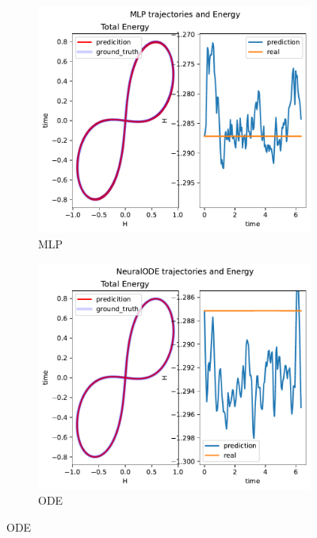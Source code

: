 \begin{figure}[H]
	\centering
	\begin{subfigure}[b]{0.3\textwidth}
		\centering
		\includegraphics[width=\textwidth]{chapters/chapter5/body3_mlp_traj.pdf}
		\caption{MLP}
	\end{subfigure}
	\hfill
	\begin{subfigure}[b]{0.3\textwidth}
		\centering
		\includegraphics[width=\textwidth]{chapters/chapter5/body3_ode_traj.pdf}
		\caption{ODE}
	\end{subfigure}
	\hfill

\end{figure}
